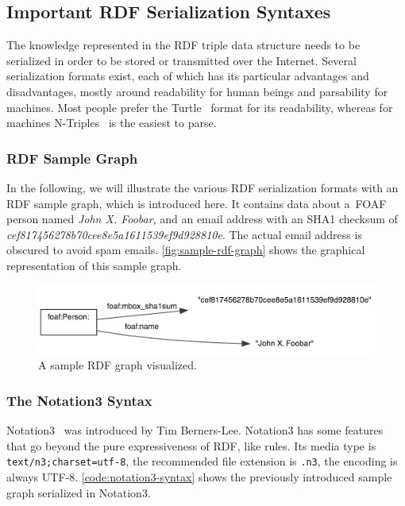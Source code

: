 \subsection{Important RDF Serialization Syntaxes}
The knowledge represented in the RDF triple data structure needs to be serialized
in order to be stored or transmitted over the Internet.
Several serialization formats exist, each of which has its particular advantages
and disadvantages, mostly around readability for human beings and parsability for machines.
Most people prefer the Turtle~\cite{Prudhommeaux2011} format for its readability,
whereas for machines N-Triples~\cite{Grant2004} is the easiest to parse.

\subsubsection{RDF Sample Graph}
In the following, we will illustrate the various RDF serialization formats
with an RDF sample graph, which is introduced here.
It contains data about a~FOAF~\cite{Brickley2010} person named \emph{John X. Foobar},
and an email address with an SHA1 checksum of \emph{cef817456278b70cee8e5a1611539\-ef9d928810e}.
The actual email address is obscured to avoid spam emails.
\autoref{fig:sample-rdf-graph} shows the graphical representation of this sample graph.

\begin{figure}[htbp!]
\begin{center}
 \includegraphics[width=\linewidth]{sample-rdf-graph.png} 
 \caption{A sample RDF graph visualized.}
 \label{fig:sample-rdf-graph}
 \end{center}  
\end{figure}

\subsubsection{The Notation3 Syntax} \label{sec:notation3}
Notation3~\cite{BernersLee2011} was introduced by Tim Berners-Lee.
Notation3 has some features that go beyond the pure expressiveness of RDF, like rules.
Its media type is \texttt{text/n3;\-charset=utf-8},
the recommended file extension is \texttt{.n3}, the encoding is always UTF-8.
\autoref{code:notation3-syntax} shows the previously introduced sample graph serialized in Notation3.


